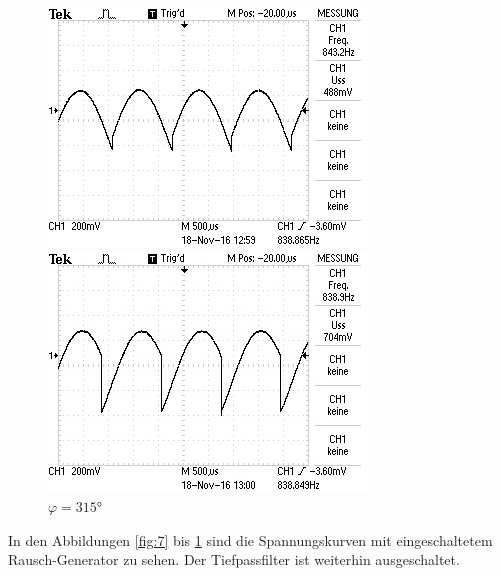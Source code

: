\begin{figure}[!h]
\begin{minipage}[t]{0.3\textwidth}
\includegraphics[width=\textwidth]{Bilder/Rausch270.jpg}
\caption{$\varphi = 270\si{\degree}$}
\label{fig:11}
\end{minipage}
\hspace{12pt}
\vspace{5pt}
\begin{minipage}[t]{0.3\textwidth}
\includegraphics[width=\textwidth]{Bilder/Rausch315.jpg}
\caption{$\varphi = 315\si{\degree}$}
\label{fig:12}
\end{minipage}
\hspace{12pt}
\vspace{5pt}
\end{figure}

In den Abbildungen \ref{fig:7} bis \ref{fig:12} sind die Spannungskurven mit
eingeschaltetem Rausch-Generator zu sehen. Der Tiefpassfilter ist weiterhin ausgeschaltet. \\


